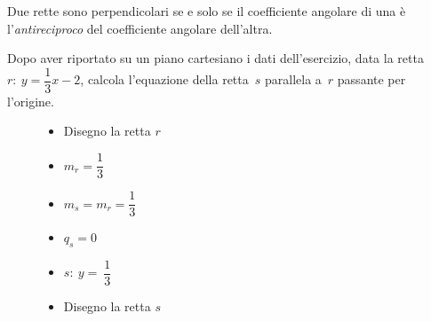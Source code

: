 \begin{definizione}
Due rette sono perpendicolari se e solo se il coefficiente angolare di 
una è l'\emph{antireciproco} del coefficiente angolare dell'altra.
\end{definizione}

 \begin{esempio}
Dopo aver riportato su un piano cartesiano i dati dell'esercizio,
data la retta~\(r:~y = \dfrac{1}{3} x-2\), calcola l'equazione della 
retta~\(s\) parallela a~\(r\) passante per l'origine.

\begin{inaccessibleblock}
 \begin{figure}[h]
 \centering
 \begin{minipage}[]{.30\textwidth}
  \begin{itemize}
  \item Disegno la retta \(r\)
  \item \(m_r = \dfrac{1}{3}\)
  \item \(m_s = m_r = \dfrac{1}{3}\)
  \item \(q_s = 0\)
  \item \(s:~ y=~\dfrac{1}{3}\)
  \item Disegno la retta \(s\)
  \end{itemize}
 \end{minipage}
 \begin{minipage}[]{.60\textwidth}
   \centering \esempioparall
 \end{minipage}
\label{fig:metodorapido}
\end{figure}
\end{inaccessibleblock}
 \end{esempio}
 
